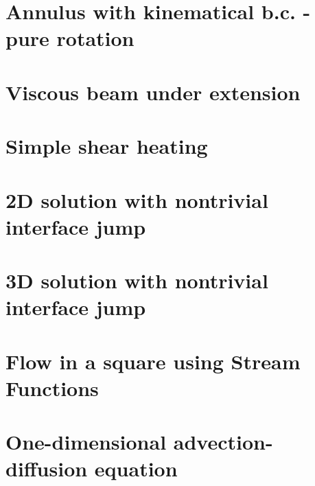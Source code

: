 \section{Annulus with kinematical b.c. - pure rotation} \label{ss:ankbc}


\section{Viscous beam under extension \label{ss:viscousbeamext}}


\section{Simple shear heating} \label{ss:shearheating} 


\section{2D solution with nontrivial interface jump} \label{ss:jump2D} 


\section{3D solution with nontrivial interface jump} \label{ss:jump3D} 


\section{Flow in a square using Stream Functions \label{ss:square_streamfct} }


\section{One-dimensional advection-diffusion equation \label{ss:advdiff} }



